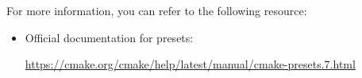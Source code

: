 For more information, you can refer to the following resource:

\begin{itemize}
\item
Official documentation for presets:

\url{https://cmake.org/cmake/help/latest/manual/cmake-presets.7.html}
\end{itemize}